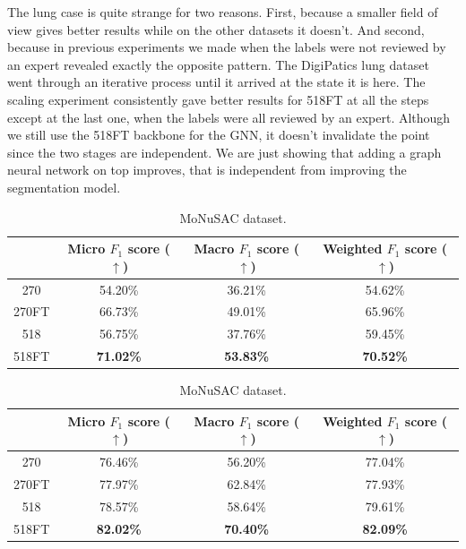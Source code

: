 The lung case is quite strange for two reasons. First, because a smaller field of view gives better results while on the other datasets it doesn't. And second, because in previous experiments we made when the labels were not reviewed by an expert revealed exactly the opposite pattern. The DigiPatics lung dataset went through an iterative process until it arrived at the state it is here. The scaling experiment consistently gave better results for 518FT at all the steps except at the last one, when the labels were all reviewed by an expert. Although we still use the 518FT backbone for the GNN, it doesn't invalidate the point since the two stages are independent. We are just showing that adding a graph neural network on top improves, that is independent from improving the segmentation model.

\begin{table}[ht]
    \centering
    \caption{Result of the Scaling CNNs experiment.}
    \begin{tabular}{c|c|c|c|}
  \cline{2-4}
  & Micro $F_1$ score ($\uparrow$) & Macro $F_1$ score ($\uparrow$) & Weighted $F_1$ score ($\uparrow$) \\ \hline
\multicolumn{1}{|c|}{270}  & 54.20\% & 36.21\% & 54.62\% \\ \hline
\multicolumn{1}{|c|}{270FT}  & 66.73\% & 49.01\% & 65.96\% \\ \hline
\multicolumn{1}{|c|}{518}  & 56.75\% & 37.76\% & 59.45\% \\ \hline
\multicolumn{1}{|c|}{518FT}  & \textbf{71.02\%} & \textbf{53.83\%} & \textbf{70.52\%} \\ \hline
\end{tabular}
\caption{CoNSeP dataset.}
\label{tab:consep-scaling}


\vspace{0.5cm}

\begin{tabular}{c|c|c|c|}
  \cline{2-4}
  & Micro $F_1$ score ($\uparrow$) & Macro $F_1$ score ($\uparrow$) & Weighted $F_1$ score ($\uparrow$)  \\ \hline
\multicolumn{1}{|c|}{270}  & 76.46\% & 56.20\% & 77.04\% \\ \hline
\multicolumn{1}{|c|}{270FT}  & 77.97\% & 62.84\% & 77.93\% \\ \hline
\multicolumn{1}{|c|}{518}  & 78.57\% & 58.64\% & 79.61\% \\ \hline
\multicolumn{1}{|c|}{518FT}  & \textbf{82.02\%} & \textbf{70.40\%} & \textbf{82.09\%} \\ \hline
\end{tabular}
\caption{MoNuSAC dataset.}


\end{table}
